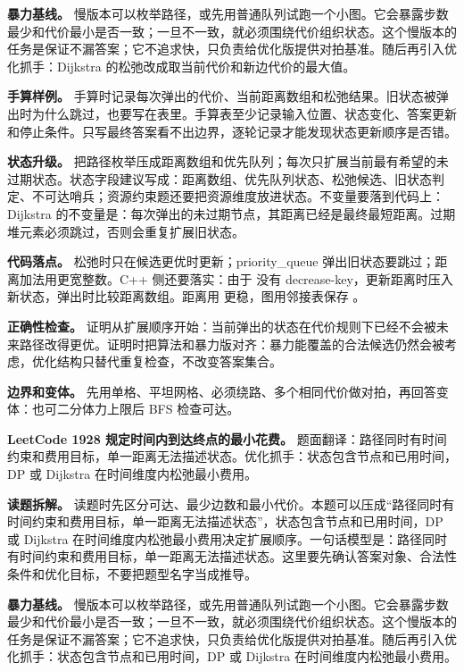 \textbf{暴力基线。} 慢版本可以枚举路径，或先用普通队列试跑一个小图。它会暴露步数最少和代价最小是否一致；一旦不一致，就必须围绕代价组织状态。这个慢版本的任务是保证不漏答案；它不追求快，只负责给优化版提供对拍基准。随后再引入优化抓手：Dijkstra 的松弛改成取当前代价和新边代价的最大值。

\textbf{手算样例。} 手算时记录每次弹出的代价、当前距离数组和松弛结果。旧状态被弹出时为什么跳过，也要写在表里。手算表至少记录输入位置、状态变化、答案更新和停止条件。只写最终答案看不出边界，逐轮记录才能发现状态更新顺序是否错。

\textbf{状态升级。} 把路径枚举压成距离数组和优先队列；每次只扩展当前最有希望的未过期状态。状态字段建议写成：距离数组、优先队列状态、松弛候选、旧状态判定、不可达哨兵；资源约束题还要把资源维度放进状态。不变量要落到代码上：Dijkstra 的不变量是：每次弹出的未过期节点，其距离已经是最终最短距离。过期堆元素必须跳过，否则会重复扩展旧状态。

\textbf{代码落点。} 松弛时只在候选更优时更新；priority\_queue 弹出旧状态要跳过；距离加法用更宽整数。C++ 侧还要落实：由于  没有 decrease-key，更新距离时压入新状态，弹出时比较距离数组。距离用  更稳，图用邻接表保存 。

\textbf{正确性检查。} 证明从扩展顺序开始：当前弹出的状态在代价规则下已经不会被未来路径改得更优。证明时把算法和暴力版对齐：暴力能覆盖的合法候选仍然会被考虑，优化结构只替代重复检查，不改变答案集合。

\textbf{边界和变体。} 先用单格、平坦网格、必须绕路、多个相同代价做对拍，再回答变体：也可二分体力上限后 BFS 检查可达。

\noindent\textbf{LeetCode 1928 规定时间内到达终点的最小花费。} 题面翻译：路径同时有时间约束和费用目标，单一距离无法描述状态。优化抓手：状态包含节点和已用时间，DP 或 Dijkstra 在时间维度内松弛最小费用。

\textbf{读题拆解。} 读题时先区分可达、最少边数和最小代价。本题可以压成“路径同时有时间约束和费用目标，单一距离无法描述状态”，状态包含节点和已用时间，DP 或 Dijkstra 在时间维度内松弛最小费用决定扩展顺序。一句话模型是：路径同时有时间约束和费用目标，单一距离无法描述状态。这里要先确认答案对象、合法性条件和优化目标，不要把题型名字当成推导。

\textbf{暴力基线。} 慢版本可以枚举路径，或先用普通队列试跑一个小图。它会暴露步数最少和代价最小是否一致；一旦不一致，就必须围绕代价组织状态。这个慢版本的任务是保证不漏答案；它不追求快，只负责给优化版提供对拍基准。随后再引入优化抓手：状态包含节点和已用时间，DP 或 Dijkstra 在时间维度内松弛最小费用。

